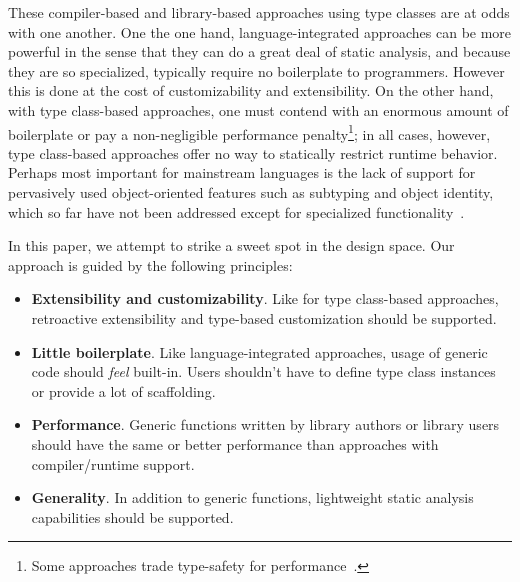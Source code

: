 \documentclass[preprint,nocopyrightspace]{sigplanconf}
\begin{document}
These compiler-based and library-based approaches using type classes are at
odds with one another. One the one hand, language-integrated approaches can be
more powerful in the sense that they can do a great deal of static analysis,
and because they are so specialized, typically require no boilerplate to
programmers. However this is done at the cost of customizability and
extensibility. On the other hand,
with type class-based approaches, one must contend with an enormous amount of
boilerplate or pay a non-negligible performance penalty\footnote{Some
approaches trade type-safety for performance~\cite{TemplateYourBoilerplate}.};
in all cases, however, type class-based approaches offer no way to statically
restrict runtime behavior. Perhaps most important for mainstream languages is
the lack of support for pervasively used object-oriented features such as
subtyping and object identity, which so far have not been addressed except for
specialized functionality~\cite{Pickling}.

In this paper, we attempt to strike a sweet spot in the design space. Our
approach is guided by the following principles:

\begin{itemize}
\item\textbf{Extensibility and customizability}. Like for type class-based
     approaches, retroactive extensibility and type-based customization
     should be supported.

\item\textbf{Little boilerplate}. Like language-integrated approaches, usage
     of generic code should \emph{feel} built-in. Users shouldn't have to define
     type class instances or provide a lot of scaffolding.

\item\textbf{Performance}. Generic functions written by library authors or library
     users should have the same or better performance than approaches with
     compiler/runtime support.

\item\textbf{Generality}. In addition to generic functions, lightweight static
     analysis capabilities should be supported.
\end{itemize}
\end{document}

